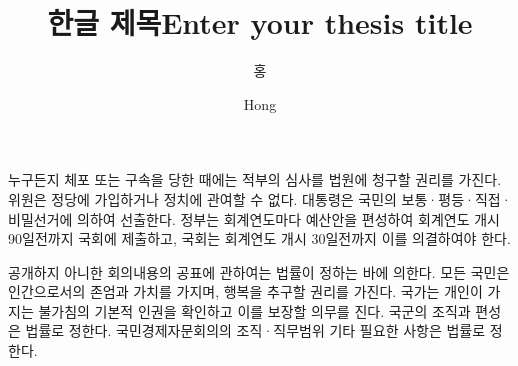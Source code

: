 \documentclass[master,english,final]{PKNU-thesis}
\title[korean]{한글 제목}
\title[english]{Enter your thesis title}
\author[korean]{홍}{길 동}
\author[english]{Hong}{Gil Dong}
\begin{document}




    \makecontents
    \begin{abstract}
        \lipsum[1]
    \end{abstract}
    \newpage

    \begin{abstractkor}
        누구든지 체포 또는 구속을 당한 때에는 적부의 심사를 법원에 청구할 권리를 가진다. 
        위원은 정당에 가입하거나 정치에 관여할 수 없다. 대통령은 국민의 보통·평등·직접·비밀선거에 의하여 선출한다. 
        정부는 회계연도마다 예산안을 편성하여 회계연도 개시 90일전까지 국회에 제출하고, 
        국회는 회계연도 개시 30일전까지 이를 의결하여야 한다.

        공개하지 아니한 회의내용의 공표에 관하여는 법률이 정하는 바에 의한다. 
        모든 국민은 인간으로서의 존엄과 가치를 가지며, 행복을 추구할 권리를 가진다. 
        국가는 개인이 가지는 불가침의 기본적 인권을 확인하고 이를 보장할 의무를 진다. 
        국군의 조직과 편성은 법률로 정한다. 국민경제자문회의의 조직·직무범위 기타 필요한 사항은 법률로 정한다.
    \end{abstractkor}


	
	
	
	
	
	







\end{document}
